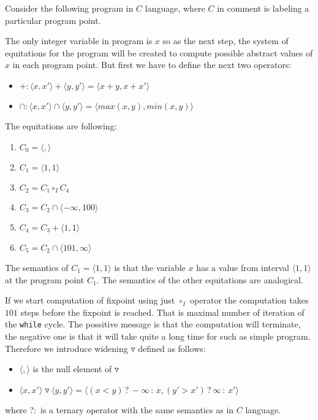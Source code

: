 \documentclass[a4paper, 12pt]{article}
\newcommand{\interval}[2]{\langle #1,#2 \rangle}
\newcommand{\ajoin}[0]{\circ}
\newcommand{\wid}[0]{\triangledown}
\newcommand{\iintg}[0]{I}
\newcommand{\ijoin}[0]{\ajoin_\iintg}
\begin{document}
Consider the following program in $C$ language, where $C$ in comment is labeling
a particular program point.



The only integer variable in program is $x$ so as the next step,
the system of equitations for the program will be created to compute possible
abstract values of $x$ in each program point.
But first we have to define the next two operators:
\begin{itemize}
	\item $+: \interval{x}{x'} + \interval{y}{y'} = \interval{x+y}{x+x'}$
	\item $\cap: \interval{x}{x'} \cap \interval{y}{y'} = \interval{max(x,y)}{min(x,y)}$
\end{itemize}

The equitations are following:
\begin{enumerate}
	\item $C_0 = \interval{}{}$
	\item $C_1 = \interval{1}{1}$
	\item $C_2 = C_1 \ijoin C_4$
	\item $C_3 = C_2 \cap \interval{-\infty}{100}$
	\item $C_4 = C_3 + \interval{1}{1}$
	\item $C_5 = C_2 \cap \interval{101}{\infty}$
\end{enumerate}

The semantics of $C_1 = \interval{1}{1}$ is that the variable $x$ has a value from interval $\interval{1}{1}$
at the program point $C_1$. The semantics of the other equitations are analogical.

If we start computation of fixpoint using just $\ijoin$ operator the computation takes $101$ steps
before the fixpoint is reached.
That is maximal number of iteration of the \texttt{while} cycle.
The possitive message is that the computation will terminate, the negative one
is that it will take quite a long time for such as simple program.
Therefore we introduce widening $\wid$ defined as follows:
\begin{itemize}
	\item $\interval{}{}$ is the null element of $\wid$
	\item $\interval{x}{x'} \wid \interval{y}{y'} = \interval{(x < y)\,?\,-\infty\,:\,x}{(y' > x')\,?\,\infty\,:\,x'}$
\end{itemize}
where $?:$ is a ternary operator with the same semantics as in $C$ language.
\end{document}
